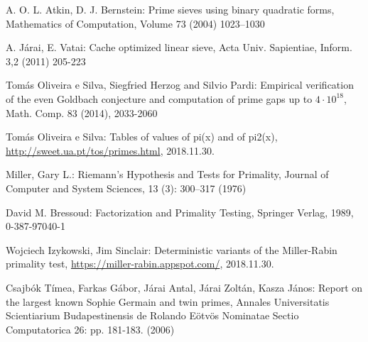 \documentclass[12pt]{report}
\begin{document}


\begin{thebibliography}{9}

A. O. L. Atkin, D. J. Bernstein: Prime sieves using binary quadratic forms, Mathematics of Computation, Volume 73 (2004) 1023–1030

A. Járai, E. Vatai: Cache optimized linear sieve, Acta Univ. Sapientiae, Inform. 3,2 (2011) 205-223

Tomás Oliveira e Silva, Siegfried Herzog and Silvio Pardi: Empirical verification of the even Goldbach conjecture and computation of prime gaps up to $4\cdot10^{18}$, Math. Comp. 83 (2014), 2033-2060

Tomás Oliveira e Silva: Tables of values of pi(x) and of pi2(x), \url{http://sweet.ua.pt/tos/primes.html}, 2018.11.30.

Miller, Gary L.: Riemann's Hypothesis and Tests for Primality, Journal of Computer and System Sciences, 13 (3): 300–317 (1976)

David M. Bressoud: Factorization and Primality Testing, Springer Verlag, 1989, 0-387-97040-1

Wojciech Izykowski, Jim Sinclair: Deterministic variants of the Miller-Rabin primality test, \url{https://miller-rabin.appspot.com/}, 2018.11.30.

Csajbók Tímea, Farkas Gábor, Járai Antal, Járai Zoltán, Kasza János: Report on the largest known Sophie Germain and twin primes, Annales Universitatis Scientiarium Budapestinensis de Rolando Eötvös Nominatae Sectio Computatorica 26: pp. 181-183. (2006)


\end{thebibliography}
\end{document}
